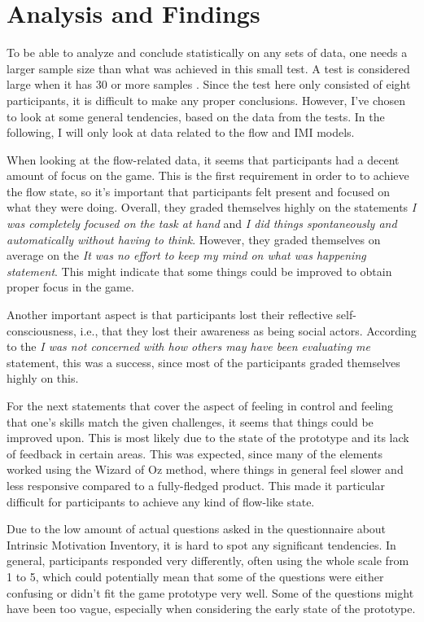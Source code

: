 \chapter{Analysis and Findings}
To be able to analyze and conclude statistically on any sets of data, one needs a larger sample size than what was achieved in this small test. A test is considered large when it has 30 or more samples \citep{statisticsBook}. Since the test here only consisted of eight participants, it is difficult to make any proper conclusions. However, I've chosen to look at some general tendencies, based on the data from the tests. In the following, I will only look at data related to the flow and IMI models.

When looking at the flow-related data, it seems that participants had a decent amount of focus on the game. This is the first requirement in order to to achieve the flow state, so it's important that participants felt present and focused on what they were doing. Overall, they graded themselves highly on the statements \textit{I was completely focused on the task at hand} and \textit{I did things spontaneously and automatically without having to think}. However, they graded themselves on average on the \textit{It was no effort to keep my mind on what was happening statement}. This might indicate that some things could be improved to obtain proper focus in the game.

Another important aspect is that participants lost their reflective self-consciousness, i.e., that they lost their awareness as being social actors. According to the \textit{I was not concerned with how others may have been evaluating me} statement, this was a success, since most of the participants graded themselves highly on this.

For the next statements that cover the aspect of feeling in control and feeling that one's skills match the given challenges, it seems that things could be improved upon. This is most likely due to the state of the prototype and its lack of feedback in certain areas. This was expected, since many of the elements worked using the Wizard of Oz method, where things in general feel slower and less responsive compared to a fully-fledged product. This made it particular difficult for participants to achieve any kind of flow-like state.

Due to the low amount of actual questions asked in the questionnaire about Intrinsic Motivation Inventory, it is hard to spot any significant tendencies. In general, participants responded very differently, often using the whole scale from 1 to 5, which could potentially mean that some of the questions were either confusing or didn't fit the game prototype very well. Some of the questions might have been too vague, especially when considering the early state of the prototype.

